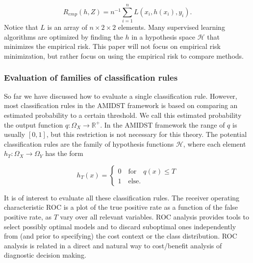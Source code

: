 \begin{equation}
\label{def:empRisk}
R_{emp}(h, Z) = n^{-1} \sum_{i=1}^n L(x_i, h(x_i), y_i).
\end{equation}
Notice that $L$ is an array of $n \times 2\times 2$ elements.  Many supervised learning algorithms are optimized by finding the $h$ in a hypothesis space $\mathcal{H}$ that minimizes the empirical risk.  This paper will not focus on empirical risk minimization, but rather focus on using the empirical risk to compare methods.


\subsubsection{Evaluation of families of classification rules}
\label{sec:hypothesisSpace}

So far we have discussed how to evaluate a single classification rule.  However, most classification rules in the AMIDST framework is based on comparing an estimated probability to a certain threshold.  We call this estimated probability the output function $q: \Omega_X \rightarrow \mathbb{R}^+$.  In the AMIDST framework the range of $q$ is usually $[0, 1]$, but this restriction is not necessary for this theory.  The potential classification rules are the family of hypothesis functions $\mathcal{H}$, where each element $h_T:\Omega_X \rightarrow \Omega_Y$ has the form 

\begin{equation}
\label{eq:ht}
h_T(x) = 
\begin{cases}
0 \quad \mbox{for} \quad q(x) \leq T\\
1 \quad \mbox{else}.
\end{cases}
\end{equation}

It is of interest to evaluate all these classification rules.  The receiver operating characteristic ROC is a plot of the true positive rate as a function of the false positive rate, as $T$ vary over all relevant variables.  ROC analysis provides tools to select possibly optimal models and to discard suboptimal ones independently from (and prior to specifying) the cost context or the class distribution. ROC analysis is related in a direct and natural way to cost/benefit analysis of diagnostic decision making.


